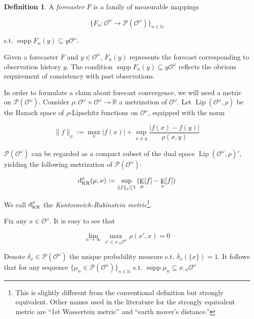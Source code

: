 \documentclass[11pt]{article}
\theoremstyle{definition}
\newtheorem{definition}{Definition}%
\theoremstyle{plain}
\newcommand{\Nats}{\mathbb{N}}
\newcommand{\Reals}{\mathbb{R}}
\newcommand{\A}[1]{\lvert #1 \rvert}
\newcommand{\N}[1]{\lVert #1 \rVert}
\newcommand{\Sq}[2]{\{#1\}_{#2 \in \Nats}}
\newcommand{\Sqn}[1]{\Sq{#1}{n}}
\DeclareMathOperator{\E}{E}
\newcommand{\PM}{\mathcal{P}}
\newcommand{\Lp}{{\operatorname{Lip}}}
\DeclareMathOperator{\Sp}{supp}
\newcommand{\DKR}{\operatorname{d}_{\textnormal{KR}}}
\newcommand{\Ob}{\mathcal{O}}
\newcommand{\OO}{\Ob^\omega}
\newcommand{\PMO}{\PM(\OO)}
\begin{document}
\begin{samepage}
\begin{definition}

A \emph{forecaster} $F$ is a family of measurable mappings

\[\Sqn{F_n: \Ob^n \rightarrow \PMO}\]

s.t. $\Sp {F_n(y)} \subseteq y\OO$.

\end{definition}
\end{samepage}

Given a forecaster $F$ and $y \in \Ob^n$, $F_n(y)$ represents the forecast corresponding to observation history $y$. The condition $\Sp {F_n(y)} \subseteq y\OO$ reflects the obvious requirement of consistency with past observations.

In order to formulate a claim about forecast convergence, we will need a metric on $\PMO$. Consider $\rho: \OO \times \OO \rightarrow \Reals$ a metrization of $\OO$. Let $\Lp(\OO,\rho)$ be the Banach space of $\rho$-Lipschitz functions on $\OO$, equipped with the norm

\begin{equation}
\N{f}_\rho:=\max_{x}{\A{f(x)}} + \sup_{x \ne y} \frac{\A{f(x)-f(y)}}{\rho(x,y)}
\end{equation}

$\PMO$ can be regarded as a compact subset of the dual space $\Lp(\OO,\rho)'$, yielding the following metrization of $\PMO$:

\begin{equation}
\DKR^\rho(\mu,\nu):=\sup_{\N{f}_\rho \leq 1}{(\E_\mu[f] - \E_\nu[f])}
\end{equation}

We call $\DKR^\rho$ the \emph{Kantorovich-Rubinstein metric}\footnote{This is slightly different from the conventional definition but strongly equivalent. Other names used in the literature for the strongly equivalent metric are \enquote{1st Wassertein metric} and \enquote{earth mover's distance.}}.

Fix any $x \in \OO$. It is easy to see that

\begin{equation}
\lim_{n \rightarrow \infty} \max_{x' \in x_{:n}\OO} \rho(x', x) = 0
\end{equation}

Denote $\delta_x \in \PMO$ the unique probability measure s.t. $\delta_x(\{x\})=1$. It follows that for any sequence $\Sqn{\mu_n \in \PMO}$ s.t. $\Sp{\mu_n} \subseteq x_{:n}\OO$
\end{document}
